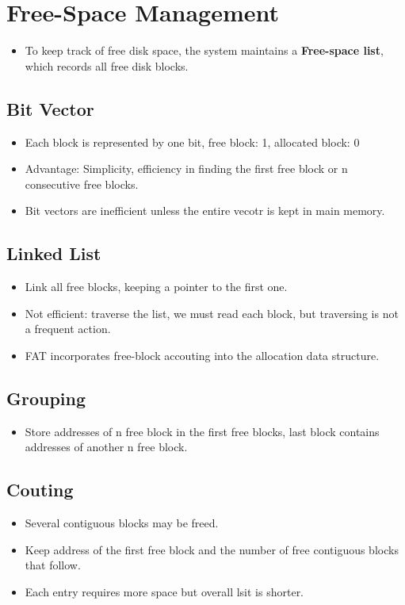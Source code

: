 \documentclass[10pt]{report}
\begin{document}
	\section{Free-Space Management}
		\begin{itemize}
			\item To keep track of free disk space, the system maintains a \textbf{Free-space list}, which records all free disk blocks.
		\end{itemize}

		\subsection{Bit Vector}
			\begin{itemize}
				\item Each block is represented by one bit, free block: 1, allocated block: 0
				\item Advantage: Simplicity, efficiency in finding the first free block or n consecutive free blocks.
				\item Bit vectors are inefficient unless the entire vecotr is kept in main memory.
			\end{itemize}

		\subsection{Linked List}
			\begin{itemize}
				\item Link all free blocks, keeping a pointer to the first one.
				\item Not efficient: traverse the list, we must read each block, but traversing is not a frequent action.
				\item FAT incorporates free-block accouting into the allocation data structure.
			\end{itemize}

		\subsection{Grouping}
			\begin{itemize}
				\item Store addresses of n free block in the first free blocks, last block contains addresses of another n free block.
			\end{itemize}

		\subsection{Couting}
			\begin{itemize}
				\item Several contiguous blocks may be freed.
				\item Keep address of the first free block and the number of free contiguous blocks that follow.
				\item Each entry requires more space but overall lsit is shorter.
			\end{itemize}
\end{document}
